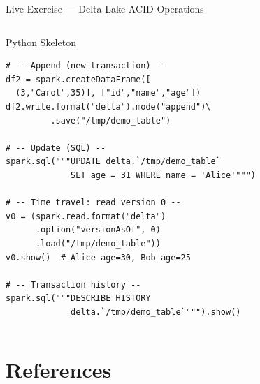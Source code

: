 \documentclass[aspectratio=169,10pt]{beamer}
\begin{document}
\begin{frame}[fragile]{Live Exercise — Delta Lake ACID Operations}
\begin{columns}[T]
\begin{exampleblock}{Python Skeleton}
\begin{verbatim}
# -- Append (new transaction) --
df2 = spark.createDataFrame([
  (3,"Carol",35)], ["id","name","age"])
df2.write.format("delta").mode("append")\
         .save("/tmp/demo_table")

# -- Update (SQL) --
spark.sql("""UPDATE delta.`/tmp/demo_table`
             SET age = 31 WHERE name = 'Alice'""")

# -- Time travel: read version 0 --
v0 = (spark.read.format("delta")
      .option("versionAsOf", 0)
      .load("/tmp/demo_table"))
v0.show()  # Alice age=30, Bob age=25

# -- Transaction history --
spark.sql("""DESCRIBE HISTORY
             delta.`/tmp/demo_table`""").show()
        \end{verbatim}
      \end{exampleblock}
  \end{columns}
\end{frame}

\section*{References}
\end{document}
